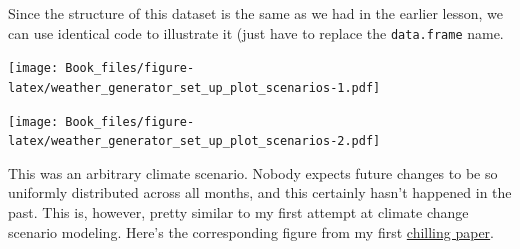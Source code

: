 \documentclass[
]{book}
\newenvironment{Shaded}{\begin{snugshade}}{\end{snugshade}}
\newcommand{\DataTypeTok}[1]{\textcolor[rgb]{0.13,0.29,0.53}{#1}}
\newcommand{\DecValTok}[1]{\textcolor[rgb]{0.00,0.00,0.81}{#1}}
\newcommand{\KeywordTok}[1]{\textcolor[rgb]{0.13,0.29,0.53}{\textbf{#1}}}
\newcommand{\NormalTok}[1]{#1}
\newcommand{\OperatorTok}[1]{\textcolor[rgb]{0.81,0.36,0.00}{\textbf{#1}}}
\newcommand{\StringTok}[1]{\textcolor[rgb]{0.31,0.60,0.02}{#1}}
\begin{document}
Since the structure of this dataset is the same as we had in the earlier lesson, we can use identical code to illustrate it (just have to replace the \texttt{data.frame} name.

\begin{Shaded}
\end{Shaded}

\texttt{[image: Book\_files/figure-latex/weather\_generator\_set\_up\_plot\_scenarios-1.pdf]}

\begin{Shaded}
\end{Shaded}

\texttt{[image: Book\_files/figure-latex/weather\_generator\_set\_up\_plot\_scenarios-2.pdf]}

This was an arbitrary climate scenario. Nobody expects future changes to be so uniformly distributed across all months, and this certainly hasn't happened in the past. This is, however, pretty similar to my first attempt at climate change scenario modeling. Here's the corresponding figure from my first \href{http://link.springer.com/10.1007/s10584-009-9581-7}{chilling paper}.
\end{document}
